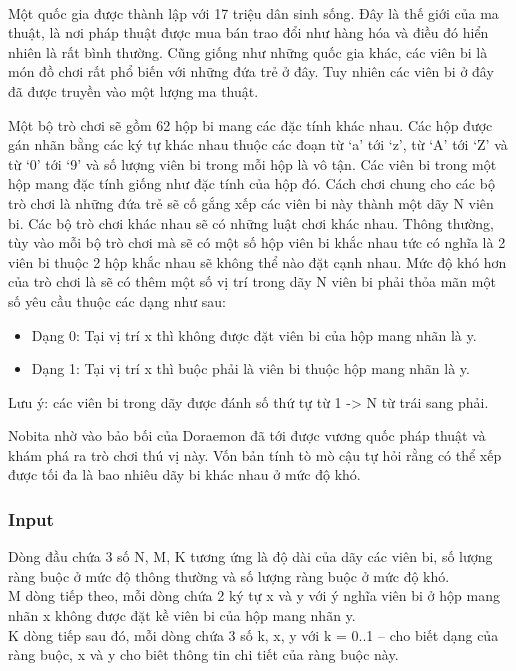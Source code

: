 

 

Một quốc gia được thành lập với 17 triệu dân sinh sống. Đây là thế giới của ma thuật, là nơi pháp thuật được mua bán trao đổi như hàng hóa và điều đó hiển nhiên là rất bình thường. Cũng giống như những quốc gia khác, các viên bi là món đồ chơi rất phổ biến với những đứa trẻ ở đây. Tuy nhiên các viên bi ở đây đã được truyền vào một lượng ma thuật.

Một bộ trò chơi sẽ gồm 62 hộp bi mang các đặc tính khác nhau. Các hộp được gán nhãn bằng các ký tự khác nhau thuộc các đoạn từ ‘a’ tới ‘z’, từ ‘A’ tới ‘Z’ và từ ‘0’ tới ‘9’ và số lượng viên bi trong mỗi hộp là vô tận. Các viên bi trong một hộp mang đặc tính giống như đặc tính của hộp đó. Cách chơi chung cho các bộ trò chơi là những đứa trẻ sẽ cố gắng xếp các viên bi này thành một dãy N viên bi. Các bộ trò chơi khác nhau sẽ có những luật chơi khác nhau. Thông thường, tùy vào mỗi bộ trò chơi mà sẽ có một số hộp viên bi khắc nhau tức có nghĩa là 2 viên bi thuộc 2 hộp khắc nhau sẽ không thể nào đặt cạnh nhau. Mức độ khó hơn của trò chơi là sẽ có thêm một số vị trí trong dãy N viên bi phải thỏa mãn một số yêu cầu thuộc các dạng như sau:
\begin{itemize}
	\item Dạng 0: Tại vị trí x thì không được đặt viên bi của hộp mang nhãn là y.
	\item Dạng 1: Tại vị trí x thì buộc phải là viên bi thuộc hộp mang nhãn là y.
\end{itemize}

Lưu ý: các viên bi trong dãy được đánh số thứ tự từ 1 -> N từ trái sang phải.

Nobita nhờ vào bảo bối của Doraemon đã tới được vương quốc pháp thuật và khám phá ra trò chơi thú vị này. Vốn bản tính tò mò cậu tự hỏi rằng có thể xếp được tối đa là bao nhiêu dãy bi khác nhau ở mức độ khó.

\subsubsection{\textbf{Input }}

Dòng đầu chứa 3 số N, M, K tương ứng là độ dài của dãy các viên bi, số lượng ràng buộc ở mức độ thông thường và số lượng ràng buộc ở mức độ khó.
\\M dòng tiếp theo, mỗi dòng chứa 2 ký tự x và y với ý nghĩa viên bi ở hộp mang nhãn x không được đặt kề viên bi của hộp mang nhãn y.
\\K dòng tiếp sau đó, mỗi dòng chứa 3 số k, x, y với k = 0..1 – cho biết dạng của ràng buộc, x và y cho biêt thông tin chi tiết của ràng buộc này.

